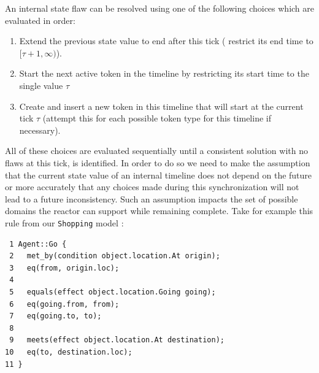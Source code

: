 An internal state flaw can be resolved using one of the following
choices which are evaluated in order:

\begin{enumerate}

\item Extend the previous state value to end after this tick (\ie
  restrict its end time to $[\tau+1, \infty)$). 

\item Start the next active token in the timeline 
  by restricting its start time to the single value $\tau$

\item Create and insert a new token in this timeline that will start
  at the current tick $\tau$ (attempt this for each possible token
  type for this timeline if necessary). 

\end{enumerate}

All of these choices are evaluated sequentially until a consistent
solution with no flaws at this tick, is identified. In order to do so
we need to make the assumption that the current state value of an
internal timeline does not depend on the future or more accurately
that any choices made during this synchronization will not lead to a
future inconsistency. Such an assumption impacts the set of possible
domains the reactor can support while remaining complete. Take for
example this rule from our \texttt{Shopping} model :

\begin{verbatim}
 1 Agent::Go {
 2   met_by(condition object.location.At origin);
 3   eq(from, origin.loc);
 4
 5   equals(effect object.location.Going going);
 6   eq(going.from, from);
 7   eq(going.to, to);
 8   
 9   meets(effect object.location.At destination);
10   eq(to, destination.loc);
11 }
\end{verbatim}

